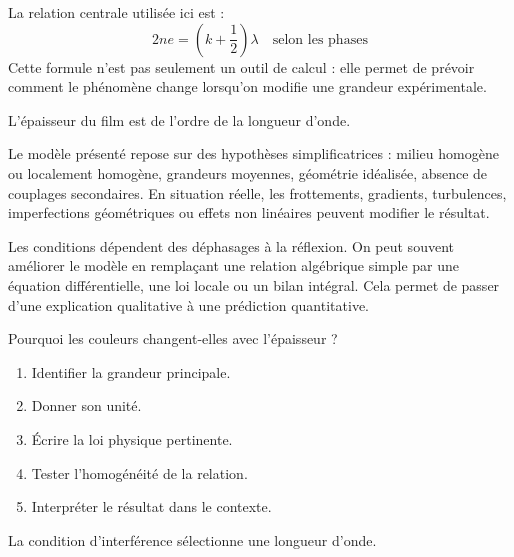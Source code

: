 \documentclass[11pt,a4paper]{article}
\begin{document}
\begin{theorembox}
La relation centrale utilisée ici est :
\[
2ne=\left(k+\frac12\right)\lambda\quad\text{selon les phases}
\]
Cette formule n'est pas seulement un outil de calcul : elle permet de prévoir comment le phénomène change lorsqu'on modifie une grandeur expérimentale.
\end{theorembox}

\begin{odgbox}
L'épaisseur du film est de l'ordre de la longueur d'onde.
\end{odgbox}

\begin{attentionbox}
Le modèle présenté repose sur des hypothèses simplificatrices : milieu homogène ou localement homogène, grandeurs moyennes, géométrie idéalisée, absence de couplages secondaires. En situation réelle, les frottements, gradients, turbulences, imperfections géométriques ou effets non linéaires peuvent modifier le résultat.
\end{attentionbox}

\begin{approfondissementbox}
Les conditions dépendent des déphasages à la réflexion.
On peut souvent améliorer le modèle en remplaçant une relation algébrique simple par une équation différentielle, une loi locale ou un bilan intégral. Cela permet de passer d'une explication qualitative à une prédiction quantitative.
\end{approfondissementbox}

\begin{exercicebox}
Pourquoi les couleurs changent-elles avec l'épaisseur ?
\begin{enumerate}
  \item Identifier la grandeur principale.
  \item Donner son unité.
  \item Écrire la loi physique pertinente.
  \item Tester l'homogénéité de la relation.
  \item Interpréter le résultat dans le contexte.
\end{enumerate}
\end{exercicebox}

\begin{corrigebox}[Indication]
La condition d'interférence sélectionne une longueur d'onde.
\end{corrigebox}
\end{document}

